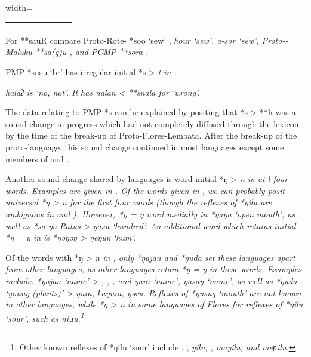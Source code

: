 \begin{table}
\begin{adjustbox}{width=\textwidth}
\begin{threeparttable}
\begin{tabular}{llllllll}
		\lspbottomrule
	\end{tabular}
		\begin{tablenotes}\tnsize
			\item[†]	{For **sauR compare Proto-Rote- *soo ‘sew’ \citep[340]{Edwards2021},
								 \it{hour} ‘sew’,  \it{a-sor} ‘sew’,
								Proto--Maluku **sa(q)u \citep{Collins1983}, and PCMP **sora \citep{BlustTrussel2020}.}
			\item[‡]	{PMP *susu ‘br’ has irregular initial *s > \it{t} in .}
			\item[Δ]	{ \it{halaʔ} is ‘no, not’.
								It has \it{nalan} < **s\<n\>ala for ‘wrong’.}
		\end{tablenotes}
	\end{threeparttable}
\end{adjustbox}
\end{table}

The data relating to PMP *s can be explained by positing that
*s > **h was a sound change in progress which had not completely
diffused through the lexicon by the time of the break-up of Proto-Flores-Lembata.
After the break-up of the proto-language,
this sound change continued in most languages except some members
of  and .

Another sound change shared by  languages is word
initial *ŋ > \it{n} in at l four words.
Examples are given in .
Of the words given in ,
we can probably posit universal *ŋ > \it{n} for the first four
words (though the reflexes of *ŋilu are ambiguous in  and ).
However, *ŋ = \it{ŋ} word medially in *ŋaŋa ‘open mouth’,
as well as *sa-ŋa-Ratus >  \it{ŋasu} ‘hundred’.
An additional word which retains initial *ŋ = \it{ŋ} in 
is *ŋəŋəŋ > \it{ŋeŋuŋ} ‘hum’.

Of the words with *ŋ > \it{n} in ,
only *ŋajan and *ŋuda set these languages apart from other 
languages, as other  languages retain *ŋ = \it{ŋ} in these words.
Examples include: *ŋajan ‘name’ > ,
, , and  \it{ŋara} ‘name’,
 \it{ŋasaŋ} ‘name’, as well as *ŋuda ‘young (plants)’
>  \it{ŋura},  \it{kaŋura},  \it{ŋəru}.
Reflexes of *ŋusuq ‘mouth’ are not known in other 
languages, while *ŋ > \it{n}
in some languages of Flores for reflexes of
*ŋilu ‘sour’, such as  \it{ni\,ɹu}.\footnote{
		Other known reflexes of *ŋilu ‘sour’ include ,
		,  \it{yilu}; ,  \it{mayilu};
		and  \it{meɲilu}.}


